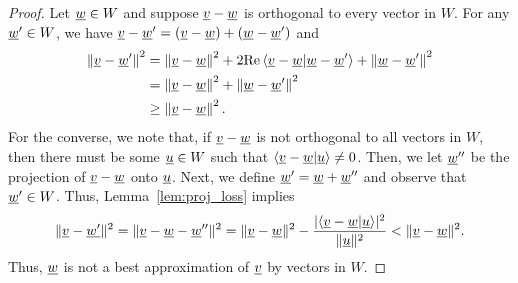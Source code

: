 \begin{proof}
Let $\underline{w} \in W$ and suppose $\underline{v} - \underline{w}$ is orthogonal to every vector in $W$.
For any $\underline{w}' \in W$, we have $\underline{v} - \underline{w}' = \left( \underline{v} - \underline{w} \right) + \left( \underline{w} - \underline{w}' \right)$ and
\begin{equation} \label{equation:OrthogonalVector}
\begin{split}
\left\| \underline{v} - \underline{w}' \right\|^2
&= \left\| \underline{v} - \underline{w} \right\|^2
+ 2 \mathrm{Re} \left\langle \underline{v} - \underline{w} | \underline{w} - \underline{w}' \right\rangle
+ \left\| \underline{w} - \underline{w}' \right\|^2 \\
&= \left\| \underline{v} - \underline{w} \right\|^2
+ \left\| \underline{w} - \underline{w}' \right\|^2 \\
&\geq \left\| \underline{v} - \underline{w} \right\|^2.
\end{split}
\end{equation}
For the converse, we note that,
if $\underline{v}-\underline{w}$ is not orthogonal to all vectors in $W$, then there must be some $\underline{u} \in W$ such that $\langle \underline{v}-\underline{w} | \underline{u} \rangle \neq 0$.
Then, we let $\underline{w}''$ be the projection of $\underline{v}-\underline{w}$ onto $\underline{u}$.
Next, we define $\underline{w}' = \underline{w}+\underline{w}''$ and observe that $\underline{w}' \in W$.
Thus, Lemma~\ref{lem:proj_loss} implies
\[ \| \underline{v}-\underline{w'} \| ^2 = \| \underline{v}-\underline{w} - \underline{w}'' \| ^2 = \|\underline{v}-\underline{w}\|^2 - \frac{|\langle \underline{v}-\underline{w} | \underline{u} \rangle|^2}{\|\underline{u}\|^2} < \| \underline{v}-\underline{w}\|^2. \]
Thus, $\underline{w}$ is not a best approximation of $\underline{v}$ by vectors in $W$.


\end{proof}
